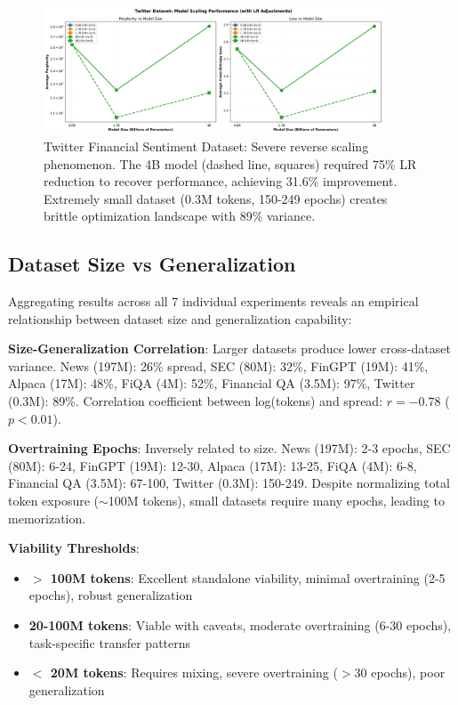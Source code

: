 \begin{figure}[h]
\centering
\includegraphics[width=0.9\textwidth]{figures/scaling_twitter.png}
\caption[Twitter Financial Sentiment Dataset: Reverse Scaling]{Twitter Financial Sentiment Dataset: Severe reverse scaling phenomenon. The 4B model (dashed line, squares) required 75\% LR reduction to recover performance, achieving 31.6\% improvement. Extremely small dataset (0.3M tokens, 150-249 epochs) creates brittle optimization landscape with 89\% variance.}
\label{fig:scaling_twitter}
\end{figure}





\subsection{Dataset Size vs Generalization}

Aggregating results across all 7 individual experiments reveals an empirical relationship between dataset size and generalization capability:

\textbf{Size-Generalization Correlation}: Larger datasets produce lower cross-dataset variance. News (197M): 26\% spread, SEC (80M): 32\%, FinGPT (19M): 41\%, Alpaca (17M): 48\%, FiQA (4M): 52\%, Financial QA (3.5M): 97\%, Twitter (0.3M): 89\%. Correlation coefficient between log(tokens) and spread: $r = -0.78$ ($p < 0.01$).

\textbf{Overtraining Epochs}: Inversely related to size. News (197M): 2-3 epochs, SEC (80M): 6-24, FinGPT (19M): 12-30, Alpaca (17M): 13-25, FiQA (4M): 6-8, Financial QA (3.5M): 67-100, Twitter (0.3M): 150-249. Despite normalizing total token exposure ($\sim$100M tokens), small datasets require many epochs, leading to memorization.

\textbf{Viability Thresholds}:
\begin{itemize}
\item \textbf{$>$ 100M tokens}: Excellent standalone viability, minimal overtraining (2-5 epochs), robust generalization
\item \textbf{20-100M tokens}: Viable with caveats, moderate overtraining (6-30 epochs), task-specific transfer patterns
\item \textbf{$<$ 20M tokens}: Requires mixing, severe overtraining ($>$30 epochs), poor generalization
\end{itemize}

